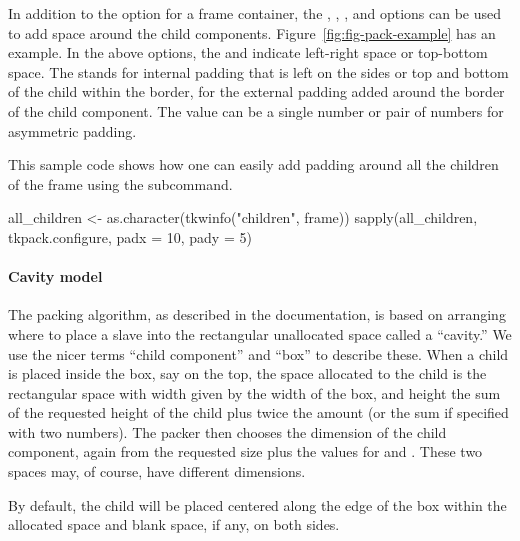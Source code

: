 In addition to the  option for a frame container, the
, , ,
and  options can be used to add space around the
child components. Figure~\ref{fig:fig-pack-example} has an
example. In the above options, the  and  indicate left-right space or
top-bottom space. The  stands for internal padding that is
left on the sides or top and bottom of the child within the border,
for  the external padding added around the border of the
child component. The value can be a single number or pair of numbers
for asymmetric padding.


This sample code shows how one can easily add padding around all the
children of the frame  using the
 subcommand.

\begin{Schunk}
\begin{Sinput}
 all_children <- as.character(tkwinfo("children", frame))
 sapply(all_children, tkpack.configure,  padx = 10, pady = 5)
 
\end{Sinput}
\end{Schunk}


\paragraph{Cavity model}
The packing algorithm, as described in the \Tk\/ documentation, is based
on arranging where to place a slave into the rectangular unallocated
space called a ``cavity.'' We use the nicer terms ``child component'' and ``box''
to describe these. When a child is placed inside the box, say on the
top, the space allocated to the child is the rectangular space with
width given by the width of the box, and height the sum of the
requested height of the child plus twice the  amount (or
the sum if specified with two numbers). The packer then chooses the
dimension of the child component, again from the requested size plus
the  values for  and . These two spaces
may, of course, have different dimensions.



By default, the child  will be placed centered along the edge of
the box within the allocated space and blank space, if any, on both
sides. 


